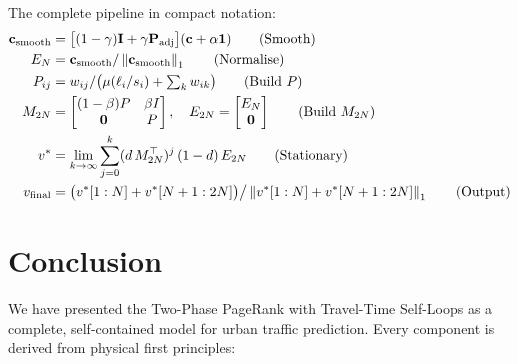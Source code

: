 \documentclass[12pt,a4paper]{article}
\theoremstyle{definition}
\theoremstyle{plain}
\newcommand{\vf}{v_{\mathrm{final}}}
\newcommand{\norm}[1]{\left\|#1\right\|}
\begin{document}
The complete pipeline in compact notation:
\begin{align}
  \mathbf{c}_{\mathrm{smooth}}
    &= \bigl[(1-\gamma)\mathbf{I} + \gamma\mathbf{P}_{\mathrm{adj}}\bigr]
       (\mathbf{c}+\alpha\mathbf{1})
    \tag{Smooth}\\
  E_N
    &= \mathbf{c}_{\mathrm{smooth}} / \norm{\mathbf{c}_{\mathrm{smooth}}}_1
    \tag{Normalise}\\
  P_{ij}
    &= w_{ij} / \bigl(\mu(\ell_i/s_i) + \textstyle\sum_k w_{ik}\bigr)
    \tag{Build $P$}\\
  M_{2N}
    &= \begin{bmatrix}(1-\beta)P & \beta I \\ \mathbf{0} & P\end{bmatrix}, \quad
    E_{2N} = \begin{bmatrix}E_N\\\mathbf{0}\end{bmatrix}
    \tag{Build $M_{2N}$}\\
  v^*
    &= \lim_{k\to\infty}
      \sum_{j=0}^{k}(d\,M_{2N}^\top)^j\,(1-d)\,E_{2N}
    \tag{Stationary}\\
  \vf
    &= \bigl(v^*[1:N]+v^*[N+1:2N]\bigr)\big/
      \norm{v^*[1:N]+v^*[N+1:2N]}_1
    \tag{Output}
\end{align}

\section{Conclusion}
\label{sec:conclusion}

We have presented the Two-Phase PageRank with Travel-Time Self-Loops as a complete,
self-contained model for urban traffic prediction. Every component is derived from
physical first principles:
\end{document}
